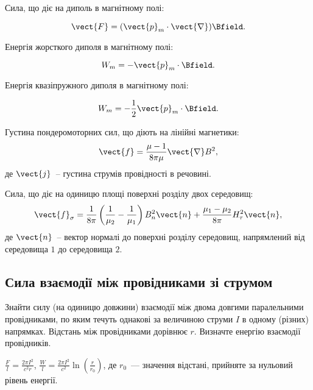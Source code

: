 \begin{Theory}
Сила, що діє на диполь в магнітному полі:

\begin{equation}
	\vect{F} = (\vect{p}_m\cdot\vect{\nabla})\Bfield.
\end{equation}

Енергія жорсткого диполя в магнітному полі:

\begin{equation}
	W_m = -\vect{p}_m\cdot\Bfield.
\end{equation}

Енергія квазіпружного диполя в магнітному полі:

\begin{equation}
	W_m = -\frac12 \vect{p}_m\cdot\Bfield.
\end{equation}

Густина пондеромоторних сил, що діють на лінійні магнетики:
\begin{equation}
	\vect{f}  = \frac{\mu - 1}{8\pi\mu}\vect{\nabla}B^2,
\end{equation}
де $\vect{j}$~-- густина струмів провідності в речовині.

Сила, що діє на одиницю площі поверхні розділу двох середовищ:
\begin{equation}
	\vect{f}_{\sigma} = \frac{1}{8\pi}\left( \frac{1}{\mu_2} - \frac{1}{\mu_1} \right) B^2_n\vect{n} + \frac{\mu_1 - \mu_2}{8\pi} H^2_{\tau}\vect{n},
\end{equation}
де $\vect{n}$~-- вектор нормалі до поверхні розділу середовищ, напрямлений від середовища $1$ до середовища $2$.
\end{Theory}

\subsection*{Сила взаємодії між провідниками зі струмом}

\begin{problem}
    Знайти силу (на одиницю довжини) взаємодії між двома довгими паралельними провідниками, по яким течуть однакові за величиною струми $I$ в одному (різних) напрямках.  Відстань між провідниками дорівнює $r$.  Визначте енергію взаємодії провідників.
\begin{solution}
	$\frac{F}{l} = \frac{2\pi I^2}{c^2r}$,
	$\frac{W}{l} = \frac{2\pi I^2}{c^2}\ln \left( \frac{r}{r_0}\right) $, де $r_0$~--- значення відстані, прийняте за нульовий рівень енергії.
\end{solution}
\end{problem}

